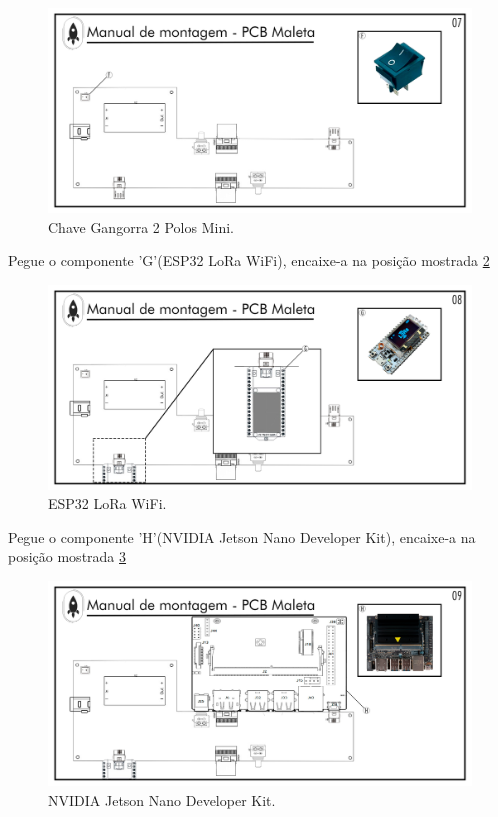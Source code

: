 \begin{figure}[H]
  \centering
  \includegraphics[width=\textwidth]{Figuras/MALETA/Pg-07---PL-01.png}
  \caption{Chave Gangorra 2 Polos Mini.}
  \label{fig:PCBMALETA CHAVE}
\end{figure}

\par Pegue o componente 'G'(ESP32 LoRa WiFi), encaixe-a na posição mostrada \ref{fig:PCBMALETA LORA}

\begin{figure}[H]
  \centering
  \includegraphics[width=\textwidth]{Figuras/MALETA/Pg-08---PL-01.png}
  \caption{ESP32 LoRa WiFi.}
  \label{fig:PCBMALETA LORA}
\end{figure}
\newpage
\par Pegue o componente 'H'(NVIDIA Jetson Nano Developer Kit), encaixe-a na posição mostrada \ref{fig:PCBMALETA NVIDIA} 
\begin{figure}[H]
  \centering
  \includegraphics[width=\textwidth]{Figuras/MALETA/Pg-09---PL-01.png}
  \caption{NVIDIA Jetson Nano Developer Kit.}
  \label{fig:PCBMALETA NVIDIA}
\end{figure}




